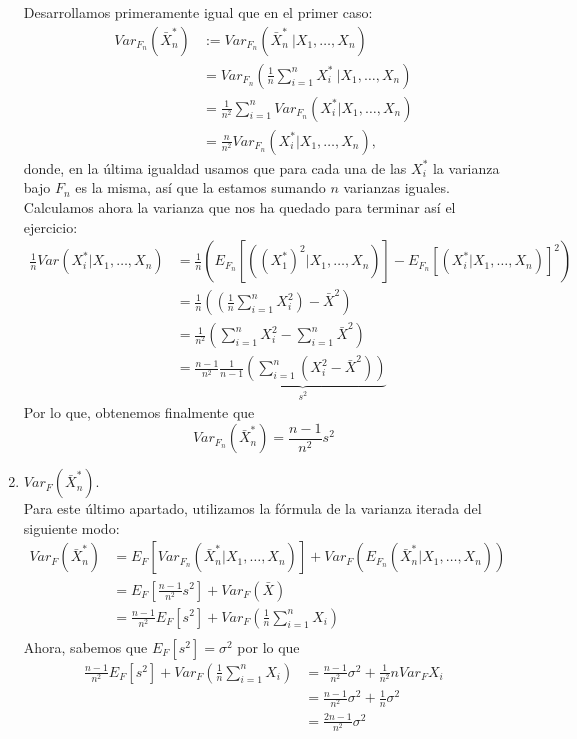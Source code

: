\documentclass[a4paper]{article}
\begin{document}
\begin{enumerate}
  Desarrollamos primeramente igual que en el primer caso:
  \begin{align*}
  Var_{F_n}\left(\bar X_n^*\right) &:= Var_{F_n}(\bar X_n^* \ | X_1,\dots, X_n)\\
    & = Var_{F_n}\left(\frac{1}{n} \sum_{i=1}^n X_i^* \ | X_1,\dots,X_n\right)\\
    & =  \frac{1}{n^2} \sum_{i=1}^n Var_{F_n}(X_i^* | X_1,\dots, X_n ) \\
    & =  \frac{n}{n^2} Var_{F_n}(X_i^* | X_1,\dots,X_n),
  \end{align*}
  donde, en la última igualdad usamos que para cada una de las \(X_i^*\) la varianza bajo \(F_n\) es la misma, así que la estamos sumando \(n\) varianzas iguales. Calculamos ahora la varianza que nos ha quedado para terminar así el ejercicio:
  \begin{align*}
    \frac{1}{n}  Var(X_i^* |X_1,\dots,X_n) &  = \frac{1}{n}\left(E_{F_n}\left[\left( (X_1^*)^2 | X_1,\dots,X_n \right)\right] - E_{F_n}\left[(X_i^*|X_1,\dots,X_n)\right]^2\right) \\
    & = \frac{1}{n} \left( \left( \frac{1}{n} \sum_{i=1}^n  X_i^2\right) - \bar X^2 \right) \\
    & = \frac{1}{n^2} \left(\sum_{i=1}^n X_i^2 - \sum_{i=1}^n \bar X^2 \right)\\
    & = \frac{n-1}{n^2} \underbrace{\frac{1}{n-1} \left(\sum_{i=1}^n (X_i^2 - \bar X^2) \right)}_{s^2}
  \end{align*}
  Por lo que, obtenemos finalmente que
  \[
  Var_{F_n}(\bar X_{n}^*) = \frac{n-1}{n^2}s^2
  \]


\item  \(Var_F(\bar X_n^*)\).\\
  Para este último apartado, utilizamos la fórmula de la varianza iterada del siguiente modo:
  \begin{align*}
    Var_F(\bar X_n^*) &= E_F\left[ Var_{F_n}(\bar X_n^*|X_1,\dots,X_n)\right] + Var_F\left(E_{F_n}(\bar X_n^*|X_1,\dots,X_n)\right) \\
    & = E_F\left[\frac{n-1}{n^2}s^2\right] + Var_F(\bar X) \\
    & = \frac{n-1}{n^2} E_F[s^2] + Var_F\left( \frac{1}{n} \sum_{i=1}^n  X_i\right) \\
  \end{align*}
  Ahora, sabemos que \(E_F[s^2] = \sigma^2\) por lo que
  \begin{align*}
    \frac{n-1}{n^2} E_F[s^2] + Var_F\left( \frac{1}{n} \sum_{i=1}^n  X_i\right) & =  \frac{n-1}{n^2}\sigma^2 + \frac{1}{n^2} n Var_F{X_i}\\
    & = \frac{n-1}{n^2}\sigma^2 + \frac{1}{n}\sigma^2 \\
    & = \frac{2n-1}{n^2}\sigma^2
  \end{align*}

   \end{enumerate}
\end{document}
